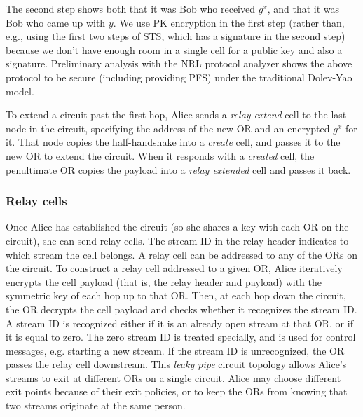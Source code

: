 \documentclass[times,10pt,twocolumn]{article}
\begin{document}
The second step shows both that it was Bob
who received $g^x$, and that it was Bob who came up with $y$. We use
PK encryption in the first step (rather than, e.g., using the first two
steps of STS, which has a signature in the second step) because we
don't have enough room in a single cell for a public key and also a
signature. Preliminary analysis with the NRL protocol analyzer \cite{meadows96}
shows the above protocol to be secure (including providing PFS) under the
traditional Dolev-Yao model.

To extend a circuit past the first hop, Alice sends a \emph{relay extend}
cell to the last node in the circuit, specifying the address of the new
OR and an encrypted $g^x$ for it. That node copies the half-handshake
into a \emph{create} cell, and passes it to the new OR to extend the
circuit. When it responds with a \emph{created} cell, the penultimate OR
copies the payload into a \emph{relay extended} cell and passes it back.

\subsubsection{Relay cells}
Once Alice has established the circuit (so she shares a key with each
OR on the circuit), she can send relay cells.
The stream ID in the relay header indicates to which stream the cell belongs.
A relay cell can be addressed to any of the ORs on the circuit. To
construct a relay cell addressed to a given OR, Alice iteratively
encrypts the cell payload (that is, the relay header and payload)
with the symmetric key of each hop up to that OR. Then, at each hop
down the circuit, the OR decrypts the cell payload and checks whether
it recognizes the stream ID.  A stream ID is recognized either if it
is an already open stream at that OR, or if it is equal to zero. The
zero stream ID is treated specially, and is used for control messages,
e.g. starting a new stream. If the stream ID is unrecognized, the OR
passes the relay cell downstream. This \emph{leaky pipe} circuit topology
allows Alice's streams to exit at different ORs on a single circuit.  
Alice may choose different exit points because of their exit policies,
or to keep the ORs from knowing that two streams
originate at the same person.
\end{document}
